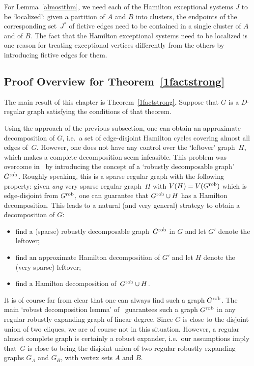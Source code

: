 \documentclass{memo-l}
\numberwithin{section}{chapter}
\numberwithin{equation}{section}
\numberwithin{firstthm}{section}
\numberwithin{figure}{section}
\begin{document}
For Lemma~\ref{almostthm}, we need each of the Hamilton exceptional systems $J$ to be `localized':
given a partition of $A$ and $B$ into clusters, the endpoints of the corresponding set~$J^*$ of fictive edges need to be contained
in a single cluster of $A$ and of $B$. 
The fact that the Hamilton exceptional systems need to be localized is one reason for treating exceptional vertices
differently from the others by introducing fictive edges for them. 

\subsection{Proof Overview for Theorem~\ref{1factstrong}}

The main result of this chapter is Theorem~\ref{1factstrong}.
Suppose that $G$ is a $D$-regular graph satisfying the conditions of that theorem.

Using the approach of the previous subsection, one can obtain an approximate decomposition of $G$,
i.e.~a set of edge-disjoint Hamilton cycles covering almost all edges of~$G$.
However, one does not have any control over the `leftover' graph~$H$, which makes a complete decomposition seem infeasible.
This problem was overcome in~\cite{Kelly} by introducing the concept of a `robustly decomposable graph'~$G^{\rm rob}$.
Roughly speaking, this is a sparse regular graph with the following property:
given \emph{any} very sparse regular graph~$H$ with $V(H)=V(G^{\rm rob})$ which is edge-disjoint from $G^{\rm rob}$,
one can guarantee that $G^{\rm rob} \cup H$ has a Hamilton decomposition.
This leads to a natural (and very general) strategy to obtain a decomposition of $G$:
\begin{itemize}
\item[(1)] find a (sparse) robustly decomposable graph~$G^{\rm rob}$ in $G$ and let $G'$ denote the leftover;
\item[(2)] find an approximate Hamilton decomposition of $G'$ and let $H$ denote the (very sparse) leftover;
\item[(3)] find a Hamilton decomposition of~$G^{\rm rob} \cup H$.
\end{itemize}
It is of course far from clear that one can always find such a graph $G^{\rm rob}$.
The main `robust decomposition lemma' of~\cite{Kelly} guarantees such a graph $G^{\rm rob}$ in any regular robustly expanding graph of linear degree.
Since $G$ is close to the disjoint union of two cliques, we are of course not in this situation. 
However, a regular almost complete graph is certainly a robust expander,
i.e.~our assumptions imply that~$G$ is close to being the disjoint union of two regular robustly expanding graphs $G_A$ and $G_B$,
with vertex sets $A$ and $B$.
\end{document}
